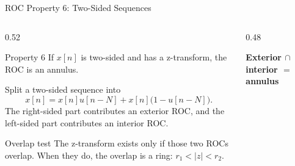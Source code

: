 \begin{frame}[t]{ROC Property 6: Two-Sided Sequences}
  \small
  \begin{columns}[T]
    \begin{column}{0.52\textwidth}
      \begin{conceptbox}{Property 6}
        If $x[n]$ is two-sided and has a z-transform, the ROC is an annulus.
      \end{conceptbox}

      Split a two-sided sequence into
      \[
        x[n]=x[n]u[n-N]+x[n]\bigl(1-u[n-N]\bigr).
      \]
      The right-sided part contributes an exterior ROC, and the left-sided part contributes an interior ROC.

      \begin{insightbox}{Overlap test}
        The z-transform exists only if those two ROCs overlap.
        When they do, the overlap is a ring: $r_1<|z|<r_2$.
      \end{insightbox}
    \end{column}
    \begin{column}{0.48\textwidth}
      \begin{center}
        \textbf{Exterior $\cap$ interior $=$ annulus}\\[0.06cm]
      \end{center}
    \end{column}
  \end{columns}
\end{frame}

